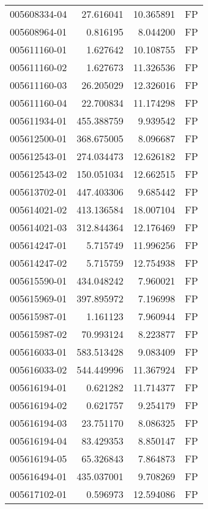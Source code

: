 \begin{tabular}{lrrl}
005608334-04 &   27.616041 &      10.365891 &   FP \\
005608964-01 &    0.816195 &       8.044200 &   FP \\
005611160-01 &    1.627642 &      10.108755 &   FP \\
005611160-02 &    1.627673 &      11.326536 &   FP \\
005611160-03 &   26.205029 &      12.326016 &   FP \\
005611160-04 &   22.700834 &      11.174298 &   FP \\
005611934-01 &  455.388759 &       9.939542 &   FP \\
005612500-01 &  368.675005 &       8.096687 &   FP \\
005612543-01 &  274.034473 &      12.626182 &   FP \\
005612543-02 &  150.051034 &      12.662515 &   FP \\
005613702-01 &  447.403306 &       9.685442 &   FP \\
005614021-02 &  413.136584 &      18.007104 &   FP \\
005614021-03 &  312.844364 &      12.176469 &   FP \\
005614247-01 &    5.715749 &      11.996256 &   FP \\
005614247-02 &    5.715759 &      12.754938 &   FP \\
005615590-01 &  434.048242 &       7.960021 &   FP \\
005615969-01 &  397.895972 &       7.196998 &   FP \\
005615987-01 &    1.161123 &       7.960944 &   FP \\
005615987-02 &   70.993124 &       8.223877 &   FP \\
005616033-01 &  583.513428 &       9.083409 &   FP \\
005616033-02 &  544.449996 &      11.367924 &   FP \\
005616194-01 &    0.621282 &      11.714377 &   FP \\
005616194-02 &    0.621757 &       9.254179 &   FP \\
005616194-03 &   23.751170 &       8.086325 &   FP \\
005616194-04 &   83.429353 &       8.850147 &   FP \\
005616194-05 &   65.326843 &       7.864873 &   FP \\
005616494-01 &  435.037001 &       9.708269 &   FP \\
005617102-01 &    0.596973 &      12.594086 &   FP \\

\end{tabular}
